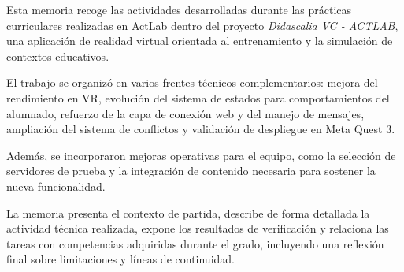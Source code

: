 Esta memoria recoge las actividades desarrolladas durante las prácticas curriculares realizadas en ActLab dentro del proyecto \textit{Didascalia VC - ACTLAB}, una aplicación de realidad virtual orientada al entrenamiento y la simulación de contextos educativos.

El trabajo se organizó en varios frentes técnicos complementarios: mejora del rendimiento en VR, evolución del sistema de estados para comportamientos del alumnado, refuerzo de la capa de conexión web y del manejo de mensajes, ampliación del sistema de conflictos y validación de despliegue en Meta Quest 3.

Además, se incorporaron mejoras operativas para el equipo, como la selección de servidores de prueba y la integración de contenido necesaria para sostener la nueva funcionalidad.

La memoria presenta el contexto de partida, describe de forma detallada la actividad técnica realizada, expone los resultados de verificación y relaciona las tareas con competencias adquiridas durante el grado, incluyendo una reflexión final sobre limitaciones y líneas de continuidad.